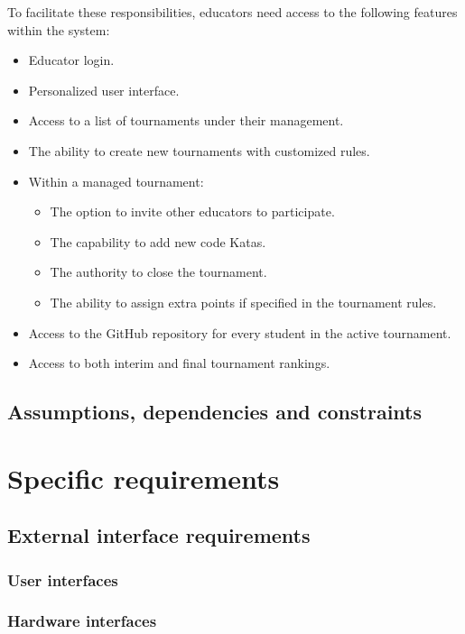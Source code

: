 \documentclass[12pt, a4paper]{report}
\begin{document}
    To facilitate these responsibilities, educators need access to the following features within the system:
    \begin{itemize}
        \item Educator login. 
        \item Personalized user interface. 
        \item Access to a list of tournaments under their management.
        \item The ability to create new tournaments with customized rules. 
        \item Within a managed tournament: 
            \begin{itemize}
                \item The option to invite other educators to participate. 
                \item The capability to add new code Katas.
                \item The authority to close the tournament.
                \item The ability to assign extra points if specified in the tournament rules.
            \end{itemize}
        \item Access to the GitHub repository for every student in the active tournament.
        \item Access to both interim and final tournament rankings.
    \end{itemize}

    \section{Assumptions, dependencies and constraints}

\newpage 

\chapter{Specific requirements}
    \section{External interface requirements}
        \subsection{User interfaces}
        \subsection{Hardware interfaces}
\end{document}
